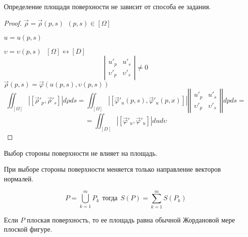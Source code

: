 \begin{theorem}
  Определение площади поверхности не зависит от способа ее задания.
\end{theorem}

\begin{proof}
  $\vec \rho = \vec \rho(p,s) ~~ (p,s) \in [\Omega]$

  $u = u(p,s)$

  $\upsilon = \upsilon(p, s) ~~~ [\Omega] \leftrightarrow [D]$
  $$
  \left|
  \begin{array}{cc}
    u'_p & u'_s \\
    \upsilon'_p & \upsilon'_s
  \end{array}
  \right| \not = 0
  $$
  $\vec \rho(p,s) = \vec \varphi(u(p,s), \upsilon(p,s))$
  $$
  \iint_{[\Omega]}|[\vec \rho'_p, \vec \rho'_s]| d\rho ds =
  \iint_{[\Omega]}|[\vec \varphi'_u(p,s), \vec \varphi'_u(p,x)]|
  \left| \left|
  \begin{array}{cc}
    u'_p & u'_s \\
    \upsilon'_p & \upsilon'_s
  \end{array}
  \right| \right|dp ds =
  $$
  $$
  = \iint_{[D]} |[\vec \varphi'_u, \vec \varphi'_u]| du d\upsilon
  $$
\end{proof}

\begin{theorem}
  Выбор стороны поверхности не влияет на площадь.

  При выборе стороны поверхности меняется только направление векторов нормалей.
\end{theorem}

\begin{theorem}
  $$
  P = \bigcup_{k=1}^m P_k ~~ \text{тогда} ~~ S(P) = \sum_{k=1}^m S(P_k)
  $$
\end{theorem}

\begin{theorem}
  Если $P$ плоская поверхность, то ее площадь равна обычной Жордановой мере
  плоской фигуре.
\end{theorem}

